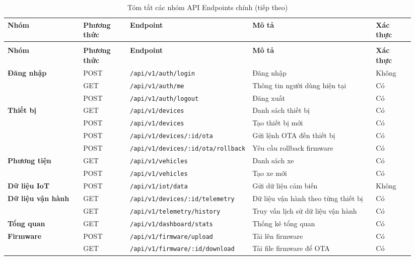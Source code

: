 \documentclass[a4paper]{extarticle}
\newcommand{\thesissettableid}[2]{%
  \renewcommand{\thetable}{#1}%
  \renewcommand{\theHtable}{#2}%
}
\begin{document}
{\thesissettableid{3.22}{tab-ch3-tom-tat-cac-nhom-api-endpoints-chinh}
\def\LTcaptype{table}
\begin{longtable}{|L{0.200\linewidth}|L{0.122\linewidth}|L{0.181\linewidth}|L{0.340\linewidth}|L{0.101\linewidth}|}
\caption{Tóm tắt các nhóm API Endpoints chính}\label{tab:ch3-tom-tat-cac-nhom-api-endpoints-chinh}\\
\hline \textbf{Nhóm} & \textbf{Phương thức} & \textbf{Endpoint} & \textbf{Mô tả} & \textbf{Xác thực} \\
\hline
\endfirsthead
\caption[]{Tóm tắt các nhóm API Endpoints chính (tiếp theo)}\\
\hline \textbf{Nhóm} & \textbf{Phương thức} & \textbf{Endpoint} & \textbf{Mô tả} & \textbf{Xác thực} \\
\hline
\endhead
\hline
\endfoot
\endlastfoot
\textbf{Đăng nhập} & POST & \nolinkurl{/api/v1/auth/login} & Đăng nhập &
Không \\\hline
& GET & \nolinkurl{/api/v1/auth/me} & Thông tin người dùng hiện tại & Có \\\hline
& POST & \nolinkurl{/api/v1/auth/logout} & Đăng xuất & Có \\\hline
\textbf{Thiết bị} & GET & \nolinkurl{/api/v1/devices} & Danh sách thiết bị & Có \\\hline
& POST & \nolinkurl{/api/v1/devices} & Tạo thiết bị mới & Có \\\hline
& POST & \nolinkurl{/api/v1/devices/:id/ota} & Gửi lệnh OTA đến thiết bị & Có \\\hline
& POST & \nolinkurl{/api/v1/devices/:id/ota/rollback} & Yêu cầu rollback firmware &
Có \\\hline
\textbf{Phương tiện} & GET & \nolinkurl{/api/v1/vehicles} & Danh sách xe & Có \\\hline
& POST & \nolinkurl{/api/v1/vehicles} & Tạo xe mới & Có \\\hline
\textbf{Dữ liệu IoT} & POST & \nolinkurl{/api/v1/iot/data} & Gửi dữ liệu cảm biến &
Không \\\hline
\textbf{Dữ liệu vận hành} & GET & \nolinkurl{/api/v1/devices/:id/telemetry} & Dữ liệu
vận hành theo từng thiết bị & Có \\\hline
& GET & \nolinkurl{/api/v1/telemetry/history} & Truy vấn lịch sử dữ liệu vận hành & Có \\\hline
\textbf{Tổng quan} & GET & \nolinkurl{/api/v1/dashboard/stats} & Thống kê tổng quan
& Có \\\hline
\textbf{Firmware} & POST & \nolinkurl{/api/v1/firmware/upload} & Tải lên firmware &
Có \\\hline
& GET & \nolinkurl{/api/v1/firmware/:id/download} & Tải file firmware để OTA & Có \\\hline
\end{longtable}
}
\end{document}
